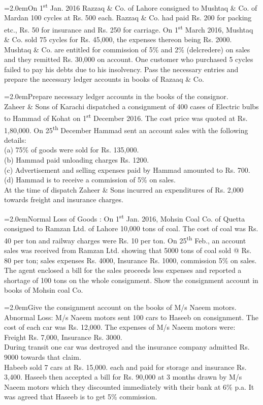 \documentclass[11pt,a4paper]{article}
\newcommand{\lqn}[2]{\Needspace{6\baselineskip}\par\medskip\noindent\hangindent=2.0em\hangafter=1\makebox[2.0em][l]{\textbf{#1.}}#2\par}
\begin{document}
\lqn{42}{On 1\textsuperscript{st}  Jan. 2016 Razzaq \& Co. of Lahore consigned to Mushtaq \& Co. of Mardan 100 cycles at Rs. 500 each. Razzaq \& Co. had paid Rs. 200 for packing etc., Rs. 50 for insurance and Rs. 250 for carriage. On 1\textsuperscript{st}  March 2016, Mushtaq \& Co. sold 75 cycles for Rs. 45,000, the expenses thereon being Rs. 2000. Mushtaq \& Co. are entitled for commission of 5\% and 2\% (delcredere) on sales and they remitted Rs. 30,000 on account. One customer who purchased 5 cycles failed to pay his debts due to his insolvency. Pass the necessary entries and prepare the necessary ledger accounts in books of Razaaq \& Co.\par
}
\lqn{43}{Prepare necessary ledger accounts in the books of the consignor.\\
Zaheer \& Sons of Karachi dispatched a consignment of 400 cases of Electric bulbs to Hammad of Kohat on 1\textsuperscript{st}  December 2016. The cost price was quoted at Rs. 1,80,000. On 25\textsuperscript{th}  December Hammad sent an account sales with the following details:\\
(a)  75\% of goods were sold for Rs. 135,000.\\
(b)  Hammad paid unloading charges Rs. 1200.\\
(c)  Advertisement and selling expenses paid by Hammad amounted to Rs. 700.\\
(d)  Hammad is to receive a commission of 5\% on sales.\\
At the time of dispatch Zaheer \& Sons incurred an expenditures of Rs. 2,000 towards freight and insurance charges.\par
}
\lqn{44}{Normal Loss of Goods : On 1\textsuperscript{st}  Jan. 2016, Mohsin Coal Co. of Quetta consigned to Ramzan Ltd. of Lahore 10,000 tons of coal. The cost of coal was Rs. 40 per ton and railway charges were Rs. 10 per ton. On 25\textsuperscript{th}  Feb., an account sales was received from Ramzan Ltd. showing that 5000 tons of coal sold @ Rs. 80 per ton; sales expenses Rs. 4000, Insurance Rs. 1000, commission 5\% on sales. The agent enclosed a bill for the sales proceeds less expenses and reported a shortage of 100 tons on the whole consignment. Show the consignment account in books of Mohsin coal Co.\par
}
\lqn{45}{Give the consignment account on the books of M/s Naeem motors.\\
Abnormal Loss:  M/s Naeem motors sent 100 cars to Haseeb on consignment. The cost of each car was Rs. 12,000. The expenses of M/s Naeem motors were:\\
Freight Rs.  7,000, Insurance Rs. 3000.\\
During transit one car was destroyed and the insurance company admitted Rs. 9000 towards that claim.\\
Habeeb sold 7 cars at Rs. 15,000. each and paid for storage and insurance Rs. 3,400. Haseeb then accepted a bill for Rs. 90,000 at 3 months drawn by M/s Naeem motors which they discounted immediately with their bank at 6\% p.a. It was agreed that Haseeb is to get 5\% commission.\par
}
\end{document}
